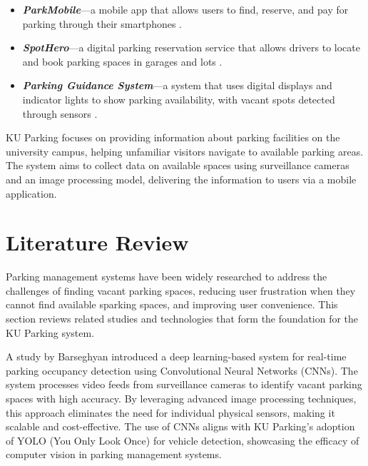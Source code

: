 \begin{itemize}
    \item \textbf{\textit{ParkMobile}}---a mobile app that allows users to find, reserve, and pay for parking through their smartphones \cite{ParkMobile_how_it_works}. 
    \item \textbf{\textit{SpotHero}}---a digital parking reservation service that allows drivers to locate and book parking spaces in garages and lots \cite{SpotHero_how_SpotHero_works}.
    \item \textbf{\textit{Parking Guidance System}}---a system that uses digital displays and indicator lights to show parking availability, with vacant spots detected through sensors \cite{Parking_Guidance_Systems}.
\end{itemize}
KU Parking focuses on providing information about parking facilities on the university campus, helping unfamiliar visitors navigate to available parking areas. The system aims to collect data on available spaces using surveillance cameras and an image processing model, delivering the information to users via a mobile application.

\section{Literature Review}
\label{section:literature-review}

Parking management systems have been widely researched to address the challenges of finding vacant parking spaces, 
reducing user frustration when they cannot find available sparking spaces, and improving user convenience. 
This section reviews related studies and technologies that form the foundation for the KU Parking system.

A study by Barseghyan \cite{barseghyan2023parking} introduced a deep learning-based system for real-time parking occupancy detection using Convolutional Neural Networks (CNNs). 
The system processes video feeds from surveillance cameras to identify vacant parking spaces with high accuracy. 
By leveraging advanced image processing techniques, this approach eliminates the need for individual physical sensors, making it scalable and cost-effective. 
The use of CNNs aligns with KU Parking's adoption of YOLO (You Only Look Once) for vehicle detection, showcasing the efficacy of computer vision in parking management systems.

